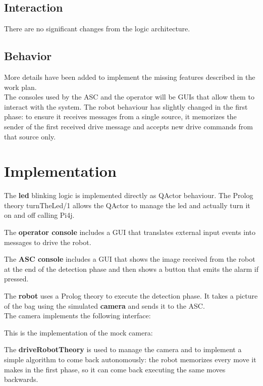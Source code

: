\documentclass{llncs}
\newcommand{\labelsec}[1]{\label{sec:#1}}
\begin{document}
\subsection{Interaction}
There are no significant changes from the logic architecture.
\subsection{Behavior}
More details have been added to implement the missing features described in the work plan.\\
The consoles used by the ASC and the operator will be GUIs that allow them to interact with the system.
The robot behaviour has slightly changed in the first phase: to ensure it receives messages from a single source, it memorizes the sender of the first received drive message and accepts new drive commands from that source only.


\section{Implementation}
\labelsec{Implementation}
The \textbf{led} blinking logic is implemented directly as QActor behaviour. The Prolog theory turnTheLed/1 allows the QActor to manage the led and actually turn it on and off calling Pi4j.

The \textbf{operator console} includes a GUI that translates external input events into messages to drive the robot.

The \textbf{ASC console} includes a GUI that shows the image received from the robot at the end of the detection phase and then shows a button that emits the alarm if pressed.

The \textbf{robot} uses a Prolog theory to execute the detection phase. It takes a picture of the bag using the simulated \textbf{camera} and sends it to the ASC.\\
The camera implements the following interface:

This is the implementation of the mock camera:

The \textbf{driveRobotTheory} is used to manage the camera and to implement a simple algorithm to come back autonomously: the robot memorizes every move it makes in the first phase, so it can come back executing the same moves backwards.\\

\end{document}
